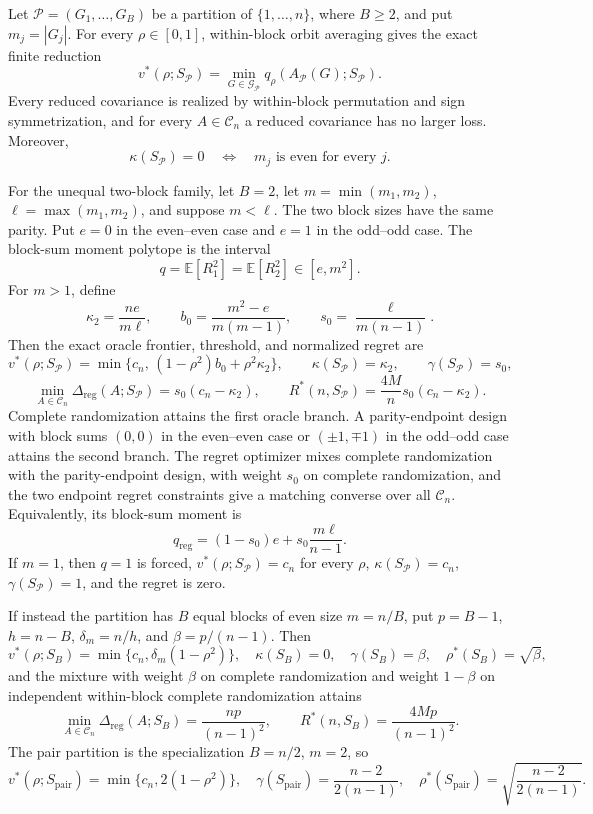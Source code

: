 Let \(\mathcal P=(G_1,\ldots,G_B)\) be a partition of \(\{1,\ldots,n\}\), where \(B\geq2\), and put \(m_j=|G_j|\).  For every \(\rho\in[0,1]\), within-block orbit averaging gives the exact finite reduction
\[
v^*(\rho;S_{\mathcal P})
=\min_{G\in\mathcal G_{\mathcal P}}
q_\rho\!\left(A_{\mathcal P}(G);S_{\mathcal P}\right).
\]
Every reduced covariance is realized by within-block permutation and sign symmetrization, and for every \(A\in\mathcal C_n\) a reduced covariance has no larger loss.  Moreover,
\[
\kappa(S_{\mathcal P})=0
\quad\Longleftrightarrow\quad
m_j\text{ is even for every }j.
\]

For the unequal two-block family, let \(B=2\), let \(m=\min(m_1,m_2)\), \(\ell=\max(m_1,m_2)\), and suppose \(m<\ell\).  The two block sizes have the same parity.  Put \(e=0\) in the even--even case and \(e=1\) in the odd--odd case.  The block-sum moment polytope is the interval
\[
q=\mathbb E[R_1^2]=\mathbb E[R_2^2]\in[e,m^2].
\]
For \(m>1\), define
\[
\kappa_2=\frac{ne}{m\ell},
\qquad b_0=\frac{m^2-e}{m(m-1)},
\qquad s_0=\frac{\ell}{m(n-1)}.
\]
Then the exact oracle frontier, threshold, and normalized regret are
\[
v^*(\rho;S_{\mathcal P})
=\min\{c_n,\,(1-\rho^2)b_0+\rho^2\kappa_2\},
\qquad
\kappa(S_{\mathcal P})=\kappa_2,
\qquad
\gamma(S_{\mathcal P})=s_0,
\]
\[
\min_{A\in\mathcal C_n}\Delta_{\mathrm{reg}}(A;S_{\mathcal P})
=s_0(c_n-\kappa_2),
\qquad
R^*(n,S_{\mathcal P})=\frac{4M}{n}s_0(c_n-\kappa_2).
\]
Complete randomization attains the first oracle branch.  A parity-endpoint design with block sums \((0,0)\) in the even--even case or \((\pm1,\mp1)\) in the odd--odd case attains the second branch.  The regret optimizer mixes complete randomization with the parity-endpoint design, with weight \(s_0\) on complete randomization, and the two endpoint regret constraints give a matching converse over all \(\mathcal C_n\).  Equivalently, its block-sum moment is
\[
q_{\mathrm{reg}}=(1-s_0)e+s_0\frac{m\ell}{n-1}.
\]
If \(m=1\), then \(q=1\) is forced, \(v^*(\rho;S_{\mathcal P})=c_n\) for every \(\rho\), \(\kappa(S_{\mathcal P})=c_n\), \(\gamma(S_{\mathcal P})=1\), and the regret is zero.

If instead the partition has \(B\) equal blocks of even size \(m=n/B\), put \(p=B-1\), \(h=n-B\), \(\delta_m=n/h\), and \(\beta=p/(n-1)\).  Then
\[
v^*(\rho;S_B)=\min\{c_n,\delta_m(1-\rho^2)\},
\quad \kappa(S_B)=0,
\quad \gamma(S_B)=\beta,
\quad \rho^*(S_B)=\sqrt\beta,
\]
and the mixture with weight \(\beta\) on complete randomization and weight \(1-\beta\) on independent within-block complete randomization attains
\[
\min_{A\in\mathcal C_n}\Delta_{\mathrm{reg}}(A;S_B)
=\frac{np}{(n-1)^2},
\qquad R^*(n,S_B)=\frac{4Mp}{(n-1)^2}.
\]
The pair partition is the specialization \(B=n/2\), \(m=2\), so
\[
v^*(\rho;S_{\mathrm{pair}})=\min\{c_n,2(1-\rho^2)\},
\quad \gamma(S_{\mathrm{pair}})=\frac{n-2}{2(n-1)},
\quad \rho^*(S_{\mathrm{pair}})=\sqrt{\frac{n-2}{2(n-1)}}.
\]
